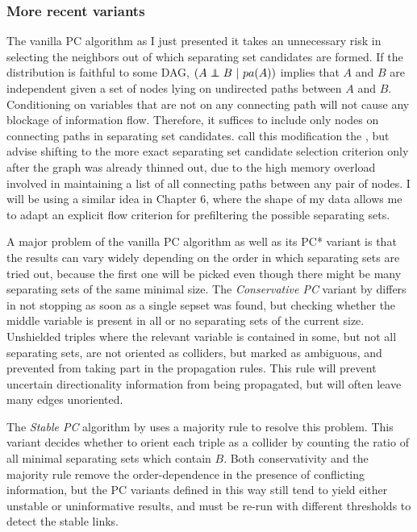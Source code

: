 \subsubsection{More recent variants}
The vanilla PC algorithm as I just presented it takes an unnecessary risk in selecting the neighbors out of which separating set candidates are formed. If the distribution is faithful to some DAG, $(A \indep B\ |\ pa(A))$ implies that $A$ and $B$ are independent given a set of nodes lying on undirected paths between $A$ and $B$. Conditioning on variables that are not on any connecting path will not cause any blockage of information flow. Therefore, it suffices to include only nodes on connecting paths in separating set candidates. \citet[5.4.2.3]{spirtes_ea_2000} call this modification the \textit{}, but advise shifting to the more exact separating set candidate selection criterion only after the graph was already thinned out, due to the high memory overload involved in maintaining a list of all connecting paths between any pair of nodes. I will be using a similar idea in Chapter 6, where the shape of my data allows me to adapt an explicit flow criterion for prefiltering the possible 
separating sets.

A major problem of the vanilla PC algorithm as well as its PC* variant is that the results can vary widely depending on the order in which separating sets are tried out, because the first one will be picked even though there might be many separating sets of the same minimal size. The \textit{Conservative PC} variant by \cite{ramsey_ea_2006} differs in not stopping as soon as a single sepset was found, but checking whether the middle variable is present in all or no separating sets of the current size. Unshielded triples where the relevant variable is contained in some, but not all separating sets, are not oriented as colliders, but marked as ambiguous, and prevented from taking part in the propagation rules. This rule will prevent uncertain directionality information from being propagated, but will often leave many edges unoriented.

The \textit{Stable PC} algorithm by \cite{colombo_maathuis_2014} uses a majority rule to resolve this problem. This variant decides whether to orient each triple as a collider by counting the ratio of all minimal separating sets which contain $B$. Both conservativity and the majority rule remove the order-dependence in the presence of conflicting information, but the PC variants defined in this way still tend to yield either unstable or uninformative results, and must be re-run with different thresholds to detect the stable links.

